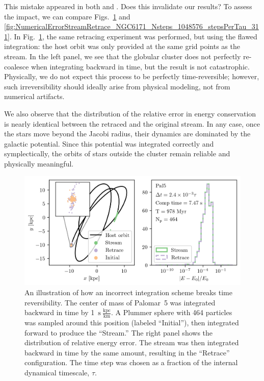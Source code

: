         This mistake appeared in both \citet{2023A&A...673A..44F} and \citet{2025arXiv250203941F}. Does this invalidate our results? To assess the impact, we can compare Figs.~\ref{fig:NumericalErrorStreamRetrace_Pal5_Nsteps_32768_stepsPerTau_420} and \ref{fig:NumericalErrorStreamRetrace_NGC6171_Nsteps_1048576_stepsPerTau_311}. In Fig.~\ref{fig:NumericalErrorStreamRetrace_Pal5_Nsteps_32768_stepsPerTau_420}, the same retracing experiment was performed, but using the flawed integration: the host orbit was only provided at the same grid points as the stream. In the left panel, we see that the globular cluster does not perfectly re-coalesce when integrating backward in time, but the result is not catastrophic. Physically, we do not expect this process to be perfectly time-reversible; however, such irreversibility should ideally arise from physical modeling, not from numerical artifacts.

        We also observe that the distribution of the relative error in energy conservation is nearly identical between the retraced and the original stream. In any case, once the stars move beyond the Jacobi radius, their dynamics are dominated by the galactic potential. Since this potential was integrated correctly and symplectically, the orbits of stars outside the cluster remain reliable and physically meaningful.

        \begin{figure}
            \centering
            \includegraphics[width=\linewidth]{images/NumericalErrorStreamRetrace_Pal5_Nsteps_32768_stepsPerTau_420.png}
            \caption{An illustration of how an incorrect integration scheme breaks time reversibility. The center of mass of Palomar~5 was integrated backward in time by 1~$\mathrm{s}~\frac{\mathrm{kpc}}{\mathrm{km}}$. A Plummer sphere with 464 particles was sampled around this position (labeled “Initial”), then integrated forward to produce the “Stream.” The right panel shows the distribution of relative energy error. The stream was then integrated backward in time by the same amount, resulting in the “Retrace” configuration. The time step was chosen as a fraction of the internal dynamical timescale, $\tau$.}
            \label{fig:NumericalErrorStreamRetrace_Pal5_Nsteps_32768_stepsPerTau_420}
        \end{figure}

